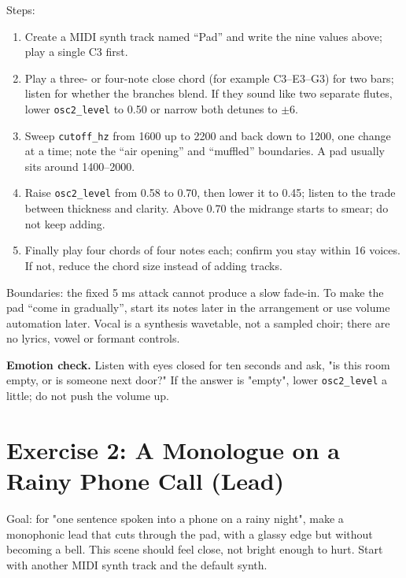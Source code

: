 \begin{exercise}
Steps:

\begin{enumerate}
  \item Create a MIDI synth track named ``Pad'' and write the nine values above; play a single C3 first.
  \item Play a three- or four-note close chord (for example C3--E3--G3) for two bars; listen for whether the branches blend. If they sound like two separate flutes, lower \texttt{osc2\_level} to 0.50 or narrow both detunes to $\pm6$.
  \item Sweep \texttt{cutoff\_hz} from 1600 up to 2200 and back down to 1200, one change at a time; note the ``air opening'' and ``muffled'' boundaries. A pad usually sits around 1400--2000.
  \item Raise \texttt{osc2\_level} from 0.58 to 0.70, then lower it to 0.45; listen to the trade between thickness and clarity. Above 0.70 the midrange starts to smear; do not keep adding.
  \item Finally play four chords of four notes each; confirm you stay within 16 voices. If not, reduce the chord size instead of adding tracks.
\end{enumerate}

Boundaries: the fixed 5 ms attack cannot produce a slow fade-in. To make the pad ``come in gradually'', start its notes later in the arrangement or use volume automation later. Vocal is a synthesis wavetable, not a sampled choir; there are no lyrics, vowel or formant controls.

\end{exercise}

\noindent\textbf{Emotion check.} Listen with eyes closed for ten seconds and ask, "is this room empty, or is someone next door?" If the answer is "empty", lower \texttt{osc2\_level} a little; do not push the volume up.

\section{Exercise 2: A Monologue on a Rainy Phone Call (Lead)}

Goal: for "one sentence spoken into a phone on a rainy night", make a monophonic lead that cuts through the pad, with a glassy edge but without becoming a bell. This scene should feel close, not bright enough to hurt. Start with another MIDI synth track and the default synth.

